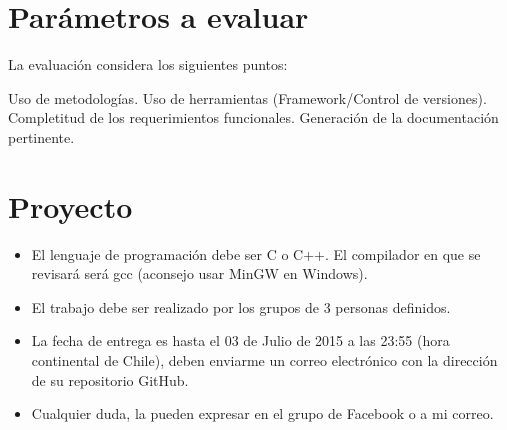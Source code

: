 \documentclass[a4paper,10pt]{article}
\begin{document}
\section{Parámetros a evaluar}

La evaluación considera los siguientes puntos:

    Uso de metodologías.
    Uso de herramientas (Framework/Control de versiones).
    Completitud de los requerimientos funcionales.
    Generación de la documentación pertinente.

\section{Proyecto}

\begin{itemize}
 \item El lenguaje de programación debe ser C o C++. El compilador en que se revisará será gcc (aconsejo usar MinGW en Windows).
 \item El trabajo debe ser realizado por los grupos de 3 personas definidos.
 \item La fecha de entrega es hasta el 03 de Julio de 2015 a las 23:55 (hora continental de Chile), deben enviarme un correo electrónico con la dirección de su repositorio GitHub.
 \item Cualquier duda, la pueden expresar en el grupo de Facebook o a mi correo.
\end{itemize}
    
\end{document}
